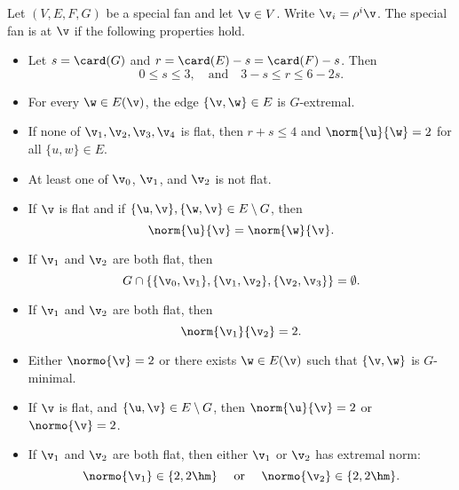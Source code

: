 \begin{definition}[irreducible] Let $(V,E,F,G)$ be a special fan and
let $\v\in V$.  Write $\v_i = \rho^i \v$.  The special fan is
 at $\v$ if the following properties hold.
\begin{itemize}
\item {} %
Let      $s=\card(G)$ and $r=\card(E) - s = \card(F)-s$.  Then
\begin{displaymath}0\le s \le 3,\quad\text{and}\quad3-s \le r \le 6 -
2s.\end{displaymath}
\item {} For every $\w\in E(\v)$, the edge
$\{\v,\w\}\in E$ is $G$-extremal.
\item {} If none of $\v_1,\v_2,\v_3,\v_4$ is flat,
then $r+s\le 4$ and $\norm{\u}{\w}=2$ for all $\{u,w\}\in E$.
\item {} At least one of $\v_0$, $\v_1$, and $\v_2$
is not flat.
\item {} If $\v$ is flat and if $\{\u,\v\},\{\w,\v\}\in
E\setminus G$, then
\begin{displaymath}
\norm{\u}{\v} = \norm{\w}{\v}.
\end{displaymath}
\item {} If $\v_1$ and $\v_2$ are both flat, then 
\begin{displaymath}G\cap
\{\{\v_0,\v_1\},\{\v_1,\v_2\},\{\v_2,\v_3\}\} =
\emptyset.\end{displaymath}
\item {} If $\v_1$ and $\v_2$ are both flat, then
\begin{displaymath}
\norm{\v_1}{\v_2} = 2.
\end{displaymath}
\item {} Either $\normo{\v}=2$ or there exists $\w\in
E(\v)$ such that $\{\v,\w\}$ is $G$-minimal.
\item {} If $\v$ is flat, and $\{\u,\v\}\in
E\setminus G$, then $\norm{\u}{\v}=2$ or $\normo{\v}=2$.
\item {} If $\v_1$ and $\v_2$ are both flat, then
either $\v_1$ or $\v_2$ has extremal norm:
\begin{displaymath}\normo{\v_1}\in \{2,2\hm\}\quad\text{ or }\quad
\normo{\v_2}\in \{2,2\hm\}.\end{displaymath}

\end{itemize}
\end{definition}
